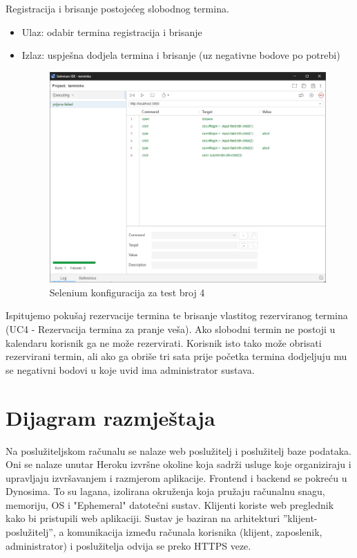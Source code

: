 \begin{packed_enum}
			 	\item Registracija i brisanje postojećeg slobodnog termina.
			 	\begin{itemize}
			 		\item Ulaz: odabir termina registracija i brisanje
			 		\item Izlaz: uspješna dodjela termina i brisanje (uz negativne bodove po potrebi)
			 		\begin{figure}[H]
			 			\includegraphics[width=0.95\linewidth]{slike/test0.png}
			 			\centering
			 			\caption{Selenium konfiguracija za test broj 4}
			 			\label{fig:dijagram_razmjestaja}
			 		\end{figure}
			 	\end{itemize}
		 	Ispitujemo pokušaj rezervacije termina te brisanje vlastitog rezerviranog termina (UC4 - Rezervacija termina za pranje veša). Ako slobodni termin ne postoji u kalendaru korisnik ga ne može rezervirati. Korisnik isto tako može obrisati rezervirani termin, ali ako ga obriše tri sata prije početka termina dodjeljuju mu se negativni bodovi u koje uvid ima administrator sustava. 
			 \end{packed_enum}
		 	 \eject
		
		
		\section{Dijagram razmještaja}
			Na poslužiteljskom računalu se nalaze web poslužitelj i poslužitelj baze podataka. Oni se nalaze unutar Heroku izvršne okoline koja sadrži usluge koje organiziraju i upravljaju izvršavanjem i razmjerom aplikacije. Frontend i backend se pokreću u Dynosima. To su lagana, izolirana okruženja koja pružaju računalnu snagu, memoriju, OS i "Ephemeral" datotečni sustav. Klijenti koriste web preglednik kako bi pristupili web aplikaciji.  Sustav je baziran na arhitekturi ”klijent-poslužitelj”, a komunikacija između računala korisnika (klijent, zaposlenik, administrator) i poslužitelja odvija se preko HTTPS veze.
			
